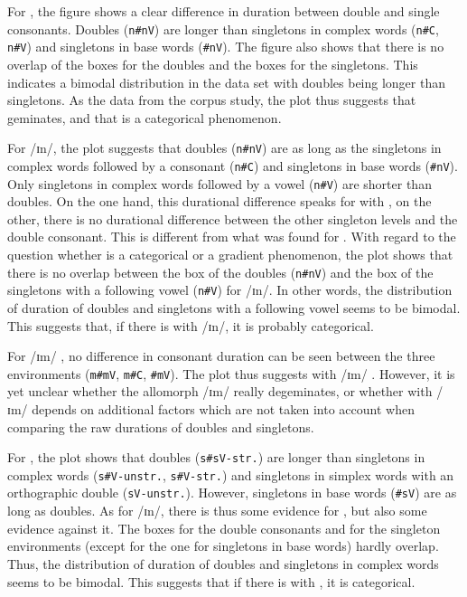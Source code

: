 For ,  the figure shows a clear difference in duration between double and single consonants. Doubles (\texttt{n\#nV}) are longer than singletons in complex words (\texttt{n\#C}, \texttt{n\#V}) and singletons in base words (\texttt{\#nV}). 
  The figure also shows that there is no overlap of the boxes for the doubles and the boxes for the singletons. This indicates a bimodal distribution in the data set with doubles being longer than singletons. 
As the data from the corpus study, the  plot thus suggests that  geminates, and that  is a categorical phenomenon. 



For /ɪn/, the plot suggests that doubles (\texttt{n\#nV}) are as long as the singletons in complex words followed by a consonant (\texttt{n\#C}) and singletons in base words (\texttt{\#nV}). Only singletons in complex words followed by a vowel (\texttt{n\#V}) are shorter than doubles. 
On the one hand, this durational difference speaks for  with , on the other, there is no durational difference between the other singleton levels and the double consonant. This is different from what was found for .
With regard to the question whether  is a categorical or a gradient phenomenon, the plot shows that there is no overlap between the box of the doubles (\texttt{n\#nV}) and the box of the singletons with a following vowel (\texttt{n\#V}) for /ɪn/. In other words, the distribution of duration of doubles and singletons with a following vowel seems to be bimodal. This suggests that, if there is  with /ɪn/, it is probably categorical.

For /ɪm/ , no difference in consonant duration can be seen between the three environments (\texttt{m\#mV}, \texttt{m\#C}, \texttt{\#mV}). The plot thus suggests  with /ɪm/ . However, 
it is yet unclear whether the allomorph /ɪm/  really degeminates, or whether  with /ɪm/  depends on additional factors which are not taken into account when comparing the raw durations of doubles and singletons. 


For , the plot shows that doubles (\texttt{s\#sV-str.})  are longer than singletons in complex words (\texttt{s\#V-unstr.}, \texttt{s\#V-str.}) and singletons in simplex words with an orthographic double (\texttt{sV-unstr.}). However, singletons in base words (\texttt{\#sV}) are as long as doubles. 
As for /ɪn/, there is thus some evidence for , but also some evidence against it.  
The boxes for the double consonants and  for the singleton environments (except for the one for singletons in base words)  hardly overlap. Thus, the distribution of duration of doubles and singletons in complex words seems to be bimodal. This suggests that if there is  with , it is categorical.


